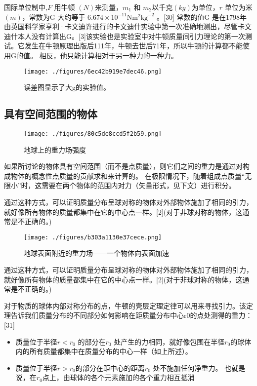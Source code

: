 国际单位制中,$F$ 用牛顿 $(N)$来测量，$m_1$ 和 $m_2$以千克$(kg)$为单位，$r$ 单位为米$(m)$，常数为G 大约等于 $ 6.674 \times 10^{-11}  \text{N} \text{m}^2 \text{kg}^{-2}$ 。[30] 常数的值G 是在1798年由英国科学家亨利·卡文迪许进行的卡文迪什实验中第一次准确地测出，尽管卡文迪什本人没有计算出G。[3]该实验也是实验室中对牛顿质量间引力理论的第一次测试。它发生在牛顿原理出版后111年，牛顿去世后71年，所以牛顿的计算都不能使用G的值。 相反，他只能计算相对于另一种力的一种力。

\begin{figure}[ht]
\centering
\texttt{[image: ./figures/6ec42b919e7dec46.png]}
\caption{误差图显示了大g的实验值。} \label{fig_UG_3}
\end{figure}

\subsection{具有空间范围的物体}

\begin{figure}[ht]
\centering
\texttt{[image: ./figures/80c5de8ccd5f2b59.png]}
\caption{地球上的重力场强度} \label{fig_UG_4}
\end{figure}

如果所讨论的物体具有空间范围（而不是点质量），则它们之间的重力是通过对构成物体的概念性点质量的贡献求和来计算的。 在极限情况下，随着组成点质量“无限小”时，这需要在两个物体的范围内对力（矢量形式，见下文）进行积分。

通过这种方式，可以证明质量分布呈球对称的物体对外部物体施加了相同的引力，就好像所有物体的质量都集中在它的中心点一样。[2](对于非球对称的物体，这通常是不正确的。)

\begin{figure}[ht]
\centering
\texttt{[image: ./figures/b303a1130e37cece.png]}
\caption{地球表面附近的重力场——一个物体向表面加速} \label{fig_UG_5}
\end{figure}

通过这种方式，可以证明质量分布呈球对称的物体对外部物体施加了相同的引力，就好像所有物体的质量都集中在它的中心点一样。[2](对于非球对称的物体，这通常是不正确的。)

对于物质的球体内部对称分布的点，牛顿的壳层定理定律可以用来寻找引力。该定理告诉我们质量分布的不同部分如何影响在距质量分布中心r0的点处测得的重力：[31]

\begin{itemize}
\item 质量位于半径$r <r_0$ 的部分在$r_0$ 处产生的力相同，就好像包围在半径$r_0$的球体内的所有质量都集中在质量分布的中心一样（如上所述）。
\item 质量位于半径$r> r_0$的部分在距中心的距离$r_0$ 处不施加任何净重力。 也就是说，在$r_0$点上，由球体的各个元素施加的各个重力相互抵消
\end{itemize}

